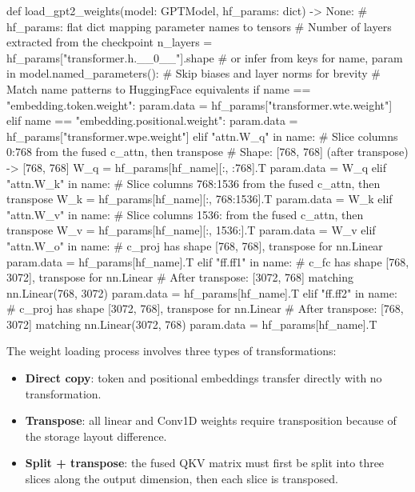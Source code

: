 \begin{pseudocode}
def load_gpt2_weights(model: GPTModel, hf_params: dict) -> None:
    # hf_params: flat dict mapping parameter names to tensors
    # Number of layers extracted from the checkpoint
    n_layers = hf_params["transformer.h.__0__"].shape  # or infer from keys
    for name, param in model.named_parameters():
        # Skip biases and layer norms for brevity
        # Match name patterns to HuggingFace equivalents
        if name == "embedding.token.weight":
            param.data = hf_params["transformer.wte.weight"]
        elif name == "embedding.positional.weight":
            param.data = hf_params["transformer.wpe.weight"]
        elif "attn.W_q" in name:
            # Slice columns 0:768 from the fused c_attn, then transpose
            # Shape: [768, 768] (after transpose) -> [768, 768]
            W_q = hf_params[hf_name][:, :768].T
            param.data = W_q
        elif "attn.W_k" in name:
            # Slice columns 768:1536 from the fused c_attn, then transpose
            W_k = hf_params[hf_name][:, 768:1536].T
            param.data = W_k
        elif "attn.W_v" in name:
            # Slice columns 1536: from the fused c_attn, then transpose
            W_v = hf_params[hf_name][:, 1536:].T
            param.data = W_v
        elif "attn.W_o" in name:
            # c_proj has shape [768, 768], transpose for nn.Linear
            param.data = hf_params[hf_name].T
        elif "ff.ff1" in name:
            # c_fc has shape [768, 3072], transpose for nn.Linear
            # After transpose: [3072, 768] matching nn.Linear(768, 3072)
            param.data = hf_params[hf_name].T
        elif "ff.ff2" in name:
            # c_proj has shape [3072, 768], transpose for nn.Linear
            # After transpose: [768, 3072] matching nn.Linear(3072, 768)
            param.data = hf_params[hf_name].T
\end{pseudocode}

\begin{keyconcept}
  The weight loading process involves three types of transformations:
  \begin{itemize}
    \item \textbf{Direct copy}: token and positional embeddings transfer
          directly with no transformation.
    \item \textbf{Transpose}: all linear and Conv1D weights require
          transposition because of the storage layout difference.
    \item \textbf{Split + transpose}: the fused QKV matrix must first be
          split into three slices along the output dimension, then each
          slice is transposed.
  \end{itemize}
\end{keyconcept}

